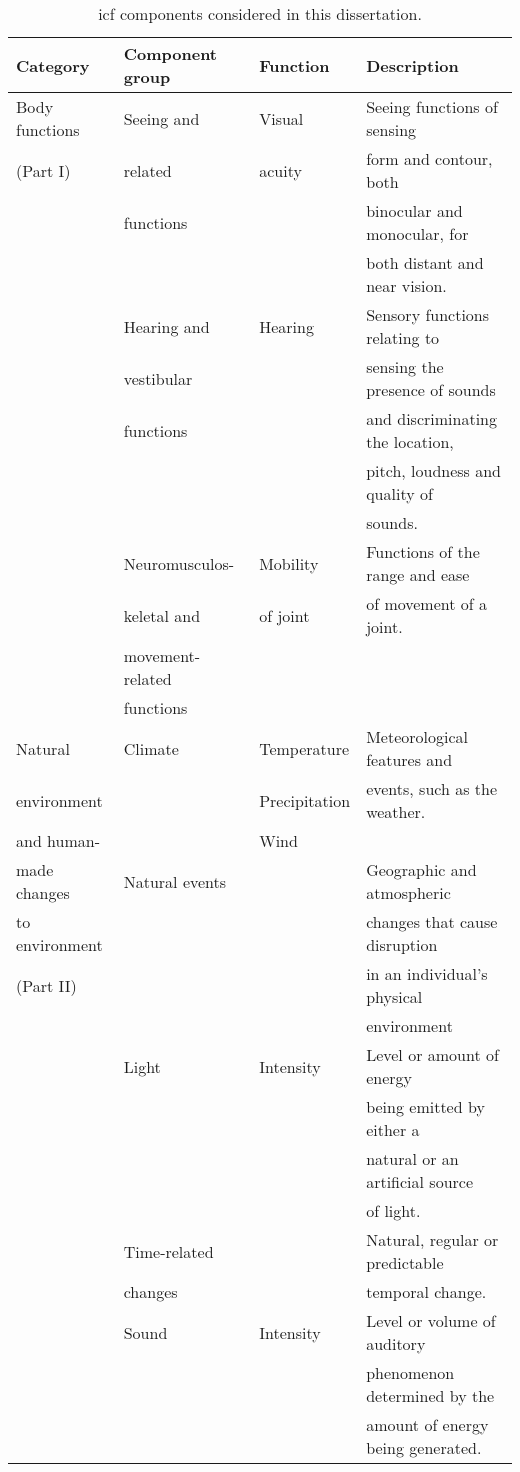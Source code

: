 \begin{table}
  \caption{\ac{icf} components considered in this dissertation.}
  \label{tbl:icf}
  \footnotesize
  \centering
  \begin{tabular}{l l l l}
    \hline
    \textbf{Category} 	& \textbf{Component group}& \textbf{Function}& \textbf{Description}\\
    \hline
    Body functions& Seeing and 	 	& Visual 	& Seeing functions of sensing	\\
    (Part I)	& related		& acuity	& form and contour, both 	\\
		& functions		& 		& binocular and monocular, for 	\\
		& 			& 		& both distant and near vision.	\\
		& Hearing and 		& Hearing 	& Sensory functions relating to \\
		& vestibular		& 		& sensing the presence of sounds\\
		& functions		& 		& and discriminating the location,\\
		& 			&		& pitch, loudness and quality of\\
		&			&		& sounds.			\\
		& Neuromusculos- 	& Mobility	& Functions of the range and ease\\ 
		& keletal and 		& of joint	& of movement of a joint.	\\
		& movement-related 	& 		& 				\\
		& functions		&		&				\\
    \hline
    Natural 	& Climate		& Temperature	& Meteorological features and 	\\
    environment & 			& Precipitation	& events, such as the weather.	\\
    and human-	&			& Wind		& 				\\
    made changes& Natural events	& 		& Geographic and atmospheric 	\\
    to environment& 			& 		& changes that cause disruption \\
    (Part II)	& 			& 		& in an individual's physical 	\\
		& 			& 		& environment			\\
		& Light			& Intensity	& Level or amount of energy 	\\
		& 			& 		& being emitted by either a 	\\
		& 			& 		& natural or an artificial source\\
		& 			& 		& of light.			\\
		& Time-related 		& 		& Natural, regular or predictable\\
		& changes		& 		& temporal change.		\\
		& Sound			& Intensity	& Level or volume of auditory 	\\
		& 			& 		& phenomenon determined by the	\\
		& 			& 		& amount of energy being generated.\\
    \hline
  \end{tabular}
\end{table}

